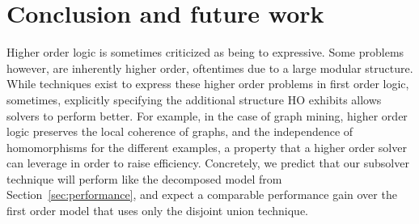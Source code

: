 \section{Conclusion and future work}\label{sec:conclusion}
Higher order logic is sometimes criticized as being to expressive.
Some problems however, are inherently higher order, oftentimes due to a large modular structure.
While techniques exist to express these higher order problems in first order logic,
sometimes, explicitly specifying the additional structure HO exhibits allows solvers to perform better.
For example, in the case of graph mining, higher order logic preserves the local coherence of graphs, and the independence of homomorphisms for the different examples, a property that a higher order solver can leverage in order to raise efficiency. 
Concretely, we predict that our subsolver technique will perform like the decomposed model from Section~\ref{sec:performance}, and expect a comparable performance gain over the first order model that uses only the disjoint union technique.